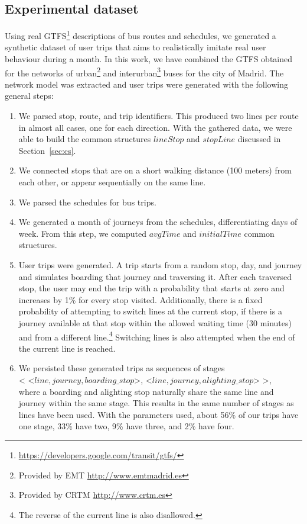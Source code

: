     \subsection{Experimental dataset}
    \label{sec:newctr:exp:data}
    Using real GTFS\footnote{\url{https://developers.google.com/transit/gtfs/}} descriptions of bus routes and schedules, we generated a synthetic dataset of user trips that aims to realistically imitate real user behaviour during a month. In this work, we have combined the GTFS obtained for the networks of urban\footnote{Provided by EMT \url{http://www.emtmadrid.es}} and interurban\footnote{Provided by CRTM \url{http://www.crtm.es}} buses for the city of Madrid. The network model was extracted and user trips were generated with the following general steps:
    
    \begin{enumerate}
        \item We parsed stop, route, and trip identifiers. This produced two lines per route in almost all cases, one for each direction. With the gathered data, we were able to build the common structures $lineStop$ and $stopLine$ discussed in Section~\ref{sec:cs}.
        \item We connected stops that are on a short walking distance (100 meters) from each other, or appear sequentially on the same line.
        \item We parsed the schedules for bus trips.
        \item We generated a month of journeys from the schedules, differentiating days of week. From this step, we computed $avgTime$ and $initialTime$ common structures.
        \item User trips were generated. A trip starts from a random stop, day, and journey and simulates boarding that journey and traversing it. After each traversed stop, the user may end the trip with a probability that starts at zero and increases by 1\% for every stop visited. Additionally, there is a fixed probability of attempting to switch lines at the current stop, if there is a journey available at that stop within the allowed waiting time (30 minutes) and from a different line.\footnote{The reverse of the current line is also disallowed.} Switching lines is also attempted when the end of the current line is reached.
        \item We persisted these generated trips as sequences of stages \\ < <$line,journey,boarding\_stop$>, <$line,journey,alighting\_stop$> >,\\ where a boarding and alighting stop naturally share the same line and journey within the same stage. This results in the same number of stages as lines have been used. With the parameters used, about 56\% of our trips have one stage, 33\% have two, 9\% have three, and 2\% have four.
    \end{enumerate}
    
